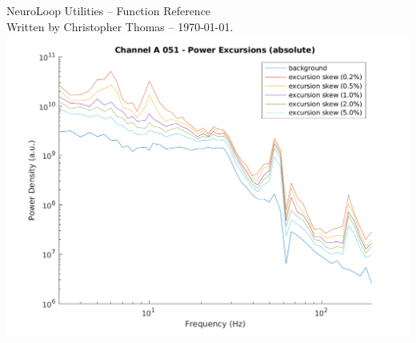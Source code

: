 \documentclass[letterpaper,11pt]{report}
\begin{document}
%
%
\pagestyle{empty}

\begin{center}
%
\vspace*{1in}
{\Huge NeuroLoop Utilities -- Function Reference} \\
{\footnotesize Written by Christopher Thomas -- \today.}
%
\vspace*{1in}\\
\includegraphics[width=6in]{plots/20201005/spect-burst-abs-A-051}
%
\end{center}
%
\vfill
{\tiny }
%
\clearpage
%
%
%
\pagestyle{plain}
\setcounter{page}{1}
%
\tableofcontents
%
\clearpage
%
%
%
\pagestyle{plain}
\setcounter{page}{1}
%







%
%
\end{document}
